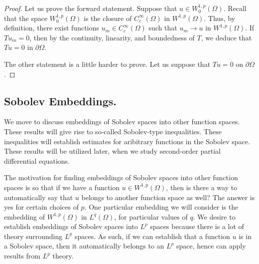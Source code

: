 \documentclass[10pt]{article}
\begin{document}
\begin{proof}
	Let us prove the forward statement. Suppose that $u \in W^{1,p}_0(\Omega)$. Recall that the space $W^{1,p}_0(\Omega)$ is the closure of $C^\infty_c(\Omega)$ in $W^{1,p}(\Omega)$. Thus, by definition, there exist functions $u_m \in C^\infty_c(\Omega)$ such that $u_m \to u$ in $W^{1,p}(\Omega)$. If $Tu_m = 0$, then by the continuity, linearity, and boundedness of $T$, we deduce that $Tu = 0$ in $\partial \Omega$. 
	
	The other statement is a little harder to prove. Let us suppose that $Tu = 0$ on $\partial \Omega$. 
\end{proof}
\subsection{Sobolev Embeddings.}

We move to discuss embeddings of Sobolev spaces into other function spaces. These results will give rise to so-called Sobolev-type inequalities. These inequalities will establish estimates for aribitrary functions in the Sobolev space. These results will be utilized later, when we study second-order partial differential equations. 

The motivation for finding embeddings of Sobolev spaces into other function spaces is so that if we have a function $u \in W^{1,p}(\Omega)$, then is there a way to automatically say that $u$ belongs to another function space as well? The answer is yes for certain choices of $p$. One particular embedding we will consider is the embedding of $W^{1,p}(\Omega)$ in $L^q(\Omega)$, for particular values of $q$. We desire to establish embeddings of Sobolev spaces into $L^p$ spaces because there is a lot of theory surrounding $L^p$ spaces. As such, if we can establish that a function $u$ is in a Sobolev space, then it automatically belongs to an $L^p$ space, hence can apply results from $L^p$ theory. 
\end{document}
